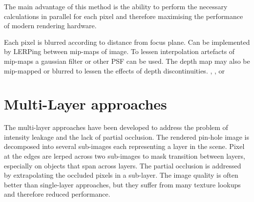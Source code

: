 The main advantage of this method is the ability to perform the necessary calculations in parallel for each pixel and therefore maximising the performance of modern rendering hardware.


Each pixel is blurred according to distance from focus plane.
Can be implemented by LERPing between mip-maps of image.
To lessen interpolation artefacts of mip-maps a gaussian filter or other PSF can be used.
The depth map may also be mip-mapped or blurred to lessen the effects of depth discontinuities.
\cite{Gilham.2007}, \cite{Hammon.2008},\cite{Zhou.2007} or \cite{Lee.2009}

\section{Multi-Layer approaches}
The multi-layer approaches have been developed to address the problem of intensity leakage and the lack of partial occlusion.
The rendered pin-hole image is decomposed into several sub-images each representing a layer in the scene.
Pixel at the edges are lerped across two sub-images to mask transition between layers, especially on objects that span across layers.
The partial occlusion is addressed by extrapolating the occluded pixels in a sub-layer.
The image quality is often better than single-layer approaches, but they suffer from many texture lookups and therefore reduced performance.

\cite{Kraus.2007}

